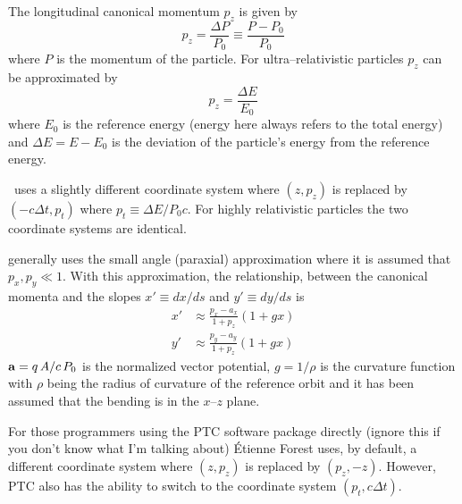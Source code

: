 The longitudinal canonical momentum $p_z$ is given by
\begin{equation}
  p_z = \frac{\Delta P}{P_0} \equiv \frac{P - P_0}{P_0}
\end{equation}
where $P$ is the momentum of the particle. For ultra--relativistic particles
$p_z$ can be approximated by
\begin{equation}
  p_z = \frac{\Delta E}{E_0}
\end{equation}
where $E_0$ is the reference energy (energy here always refers to the
total energy) and $\Delta E = E - E_0$ is the deviation of the
particle's energy from the reference energy. 

\mad\ uses a slightly different coordinate system where $(z, p_z)$ is
replaced by $(-c\Delta t, p_t)$ where $p_t \equiv \Delta E / P_0
c$. For highly relativistic particles the two coordinate systems are
identical.

\bmad generally uses the small angle (paraxial) approximation
where it is assumed that $p_x, p_y \ll 1$. With this approximation, the
relationship, between the canonical momenta and the slopes $x' \equiv dx/ds$
and $y' \equiv dy/ds$ is
\begin{align}
  x' &\approx \frac{p_x - a_x}{1 + p_z} (1 + g x) \\
  y' &\approx \frac{p_y - a_y}{1 + p_z} (1 + g x) 
\end{align}
${\bf a} = q \, A / c \, P_0$ is the normalized vector potential, $g =
1/\rho$ is the curvature function with $\rho$ being the radius of
curvature of the reference orbit and it has been assumed that the
bending is in the $x$--$z$ plane. 

For those programmers using the PTC
software package directly (ignore
this if you don't know what I'm talking about) \'Etienne Forest uses,
by default, a different coordinate system where $(z, p_z)$ is replaced
by $(p_z, -z)$. However, PTC also has the ability to switch to the
coordinate system $(p_t, c \Delta t)$.